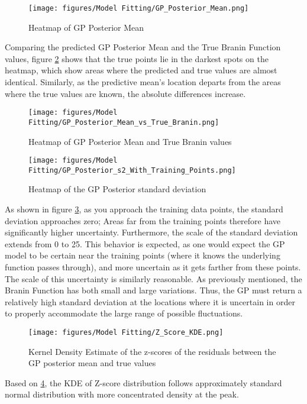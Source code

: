 \documentclass[11pt]{article}
\numberwithin{equation}{section}
\begin{document}
\begin{figure}[H]
  \centering
  \texttt{[image: figures/Model Fitting/GP\_Posterior\_Mean.png]}
  \caption{Heatmap of GP Posterior Mean}
  \label{fig:gp_post_mean_heatmap}
\end{figure}

Comparing the predicted GP Posterior Mean and the True Branin Function values, figure \ref{fig:gp_postmean_and_trueval} shows that the true points lie in the darkest spots on the heatmap, which show areas where the predicted and true values are almost identical. Similarly, as the predictive mean's location departs from the areas where the true values are known, the absolute differences increase.

\begin{figure}[H]
  \centering
  \texttt{[image: figures/Model Fitting/GP\_Posterior\_Mean\_vs\_True\_Branin.png]}
  \caption{Heatmap of GP Posterior Mean and True Branin values}
  \label{fig:gp_postmean_and_trueval}
\end{figure}

\begin{figure}[H]
  \centering
  \texttt{[image: figures/Model Fitting/GP\_Posterior\_s2\_With\_Training\_Points.png]}
  \caption{Heatmap of the GP Posterior standard deviation}
  \label{fig:gp_post_std}
\end{figure}
As shown in figure \ref{fig:gp_post_std}, as you approach the training data points, the standard deviation approaches zero; Areas far from the training points therefore have significantly higher uncertainty. Furthermore, the scale of the standard deviation extends from 0 to 25. This behavior is expected, as one would expect the GP model to be certain near the training points (where it knows the underlying function passes through), and more uncertain as it gets farther from these points. The scale of this uncertainty is similarly reasonable. As previously mentioned, the Branin Function has both small and large variations. Thus, the GP must return a relatively high standard deviation at the locations where it is uncertain in order to properly accommodate the large range of possible fluctuations.

\begin{figure}[H]
  \centering
  \texttt{[image: figures/Model Fitting/Z\_Score\_KDE.png]}
  \caption{Kernel Density Estimate of the z-scores of the residuals between the GP posterior mean and true values}
  \label{fig:zscore_kde}
\end{figure}
Based on \ref{fig:zscore_kde}, the KDE of Z-score distribution follows approximately standard normal distribution with more concentrated density at the peak.
\end{document}
